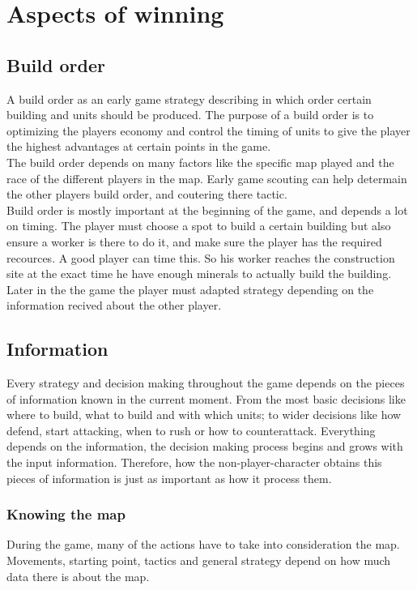 \section{Aspects of winning}
	\subsection{Build order}
		A build order as an early game strategy describing in which order certain building and units should be produced\cite{wiki_build_order}. 
		The purpose of a build order is to optimizing the players economy and control the timing of units to give 
		the player the highest advantages at certain points in the game.\\
		The build order depends on many factors like the specific map played and the race of the different players in the map. 
		Early game scouting can help determain the other players build order, and coutering there tactic.\\
		
		Build order is mostly important at the beginning of the game, and depends a lot on timing. 
		The player must choose a spot to build a certain building but also ensure a worker is there to do it, 
		and make sure the player has the required recources. 
		A good player can time this. 
		So his worker reaches the construction site at the exact time he have enough minerals to actually build the building.\\
		
		Later in the the game the player must adapted strategy depending on the information recived about the other player.
	
	\subsection{Information}

		Every strategy and decision making throughout the game depends on the pieces of information 
		known in the current moment. From the most basic decisions like where to build, what to build and
		with which units; to wider decisions like how defend, start attacking, when to rush or how to counterattack.
		Everything depends on the information, the decision making process begins and grows with the input information.
		Therefore, how the non-player-character obtains this pieces of information is just as important 
		as how it process them. 
	
			\subsubsection{Knowing the map}
				During the game, many of the actions have to take into consideration the map. Movements, starting point, 
				tactics and general strategy depend on how much data there is about the map.  
				
